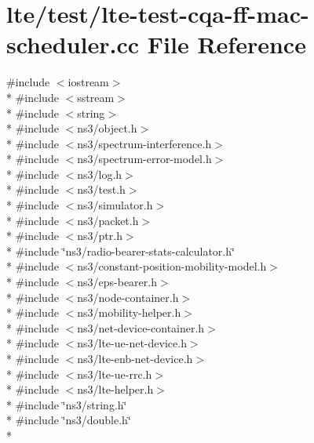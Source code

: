 \hypertarget{lte-test-cqa-ff-mac-scheduler_8cc}{}\section{lte/test/lte-\/test-\/cqa-\/ff-\/mac-\/scheduler.cc File Reference}
\label{lte-test-cqa-ff-mac-scheduler_8cc}
{\ttfamily \#include $<$iostream$>$}\\*
{\ttfamily \#include $<$sstream$>$}\\*
{\ttfamily \#include $<$string$>$}\\*
{\ttfamily \#include $<$ns3/object.\+h$>$}\\*
{\ttfamily \#include $<$ns3/spectrum-\/interference.\+h$>$}\\*
{\ttfamily \#include $<$ns3/spectrum-\/error-\/model.\+h$>$}\\*
{\ttfamily \#include $<$ns3/log.\+h$>$}\\*
{\ttfamily \#include $<$ns3/test.\+h$>$}\\*
{\ttfamily \#include $<$ns3/simulator.\+h$>$}\\*
{\ttfamily \#include $<$ns3/packet.\+h$>$}\\*
{\ttfamily \#include $<$ns3/ptr.\+h$>$}\\*
{\ttfamily \#include \char`\"{}ns3/radio-\/bearer-\/stats-\/calculator.\+h\char`\"{}}\\*
{\ttfamily \#include $<$ns3/constant-\/position-\/mobility-\/model.\+h$>$}\\*
{\ttfamily \#include $<$ns3/eps-\/bearer.\+h$>$}\\*
{\ttfamily \#include $<$ns3/node-\/container.\+h$>$}\\*
{\ttfamily \#include $<$ns3/mobility-\/helper.\+h$>$}\\*
{\ttfamily \#include $<$ns3/net-\/device-\/container.\+h$>$}\\*
{\ttfamily \#include $<$ns3/lte-\/ue-\/net-\/device.\+h$>$}\\*
{\ttfamily \#include $<$ns3/lte-\/enb-\/net-\/device.\+h$>$}\\*
{\ttfamily \#include $<$ns3/lte-\/ue-\/rrc.\+h$>$}\\*
{\ttfamily \#include $<$ns3/lte-\/helper.\+h$>$}\\*
{\ttfamily \#include \char`\"{}ns3/string.\+h\char`\"{}}\\*
{\ttfamily \#include \char`\"{}ns3/double.\+h\char`\"{}}\\*
